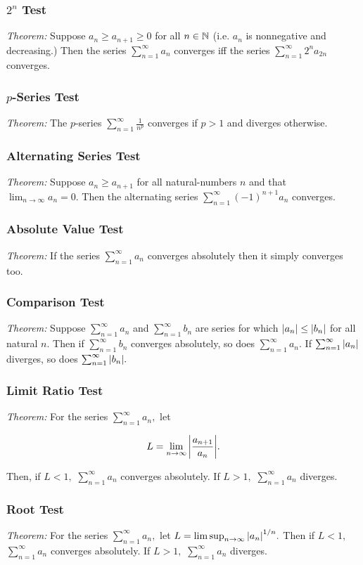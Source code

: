 \documentclass{article}
\begin{document}
\subsubsection{$2^n$ Test}
\emph{Theorem:} Suppose $a_n \geq a_{n+1} \geq {0}$ for all $n \in \mathbb{N}$ (i.e. $a_n$ is nonnegative and decreasing.) Then the series $\sum_{n=1}^{\infty}{a_n}$ converges iff the series $\sum_{n=1}^{\infty}{2^n a_{2n}}$ converges.

\subsubsection{$p$-Series Test}
\emph{Theorem:} The $p$-series $\sum_{n=1}^{\infty}{\frac{1}{n^p}}$ converges if $p > 1$ and diverges otherwise.

\subsubsection{Alternating Series Test}
\emph{Theorem:} Suppose $a_n \geq a_{n+1}$ for all \@{natural-numbers} $n$ and that $\lim_{n \to \infty}{a_n} = 0.$ Then the alternating series $\sum_{n=1}^{\infty}{(-1)^{n+1}a_n}$ converges.

\subsubsection{Absolute Value Test}
\emph{Theorem:}  If the series $\sum_{n=1}^{\infty}{a_n}$ converges absolutely then it simply converges too.

\subsubsection{Comparison Test}
\emph{Theorem:} Suppose $\sum_{n=1}^{\infty}{a_n}$ and $\sum_{n=1}^{\infty}{b_n}$ are series for which $\left| a_n \right| \leq \left| b_n \right|$ for all natural $n.$ Then if $\sum_{n=1}^{\infty}{b_n}$ converges absolutely, so does $\sum_{n=1}^{\infty}{a_n}.$ If $\sum_{n=1}^{\infty}{\left| a_n \right|}$ diverges, so does $\sum_{n=1}^{\infty}{\left| b_n \right|}.$

\subsubsection{Limit Ratio Test}
\emph{Theorem:} For the series $\sum_{n=1}^{\infty}{a_n},$ let

\[ L = \lim_{n \to \infty}{\left| \frac{a_{n+1}}{a_n} \right|}. \] 

Then, if $L < 1,$ $\sum_{n=1}^{\infty}{a_n}$ converges absolutely. If $L > 1,$ $\sum_{n=1}^{\infty}{a_n}$ diverges.

\subsubsection{Root Test}
\emph{Theorem:}  For the series $\sum_{n=1}^{\infty}{a_n},$ let $L = \limsup_{n \to \infty}{\left| a_n \right|^{1/n}}.$ Then if $L < 1,$ $\sum_{n=1}^{\infty}{a_n}$ converges absolutely. If $L > 1,$ $\sum_{n=1}^{\infty}{a_n}$ diverges.
\end{document}
